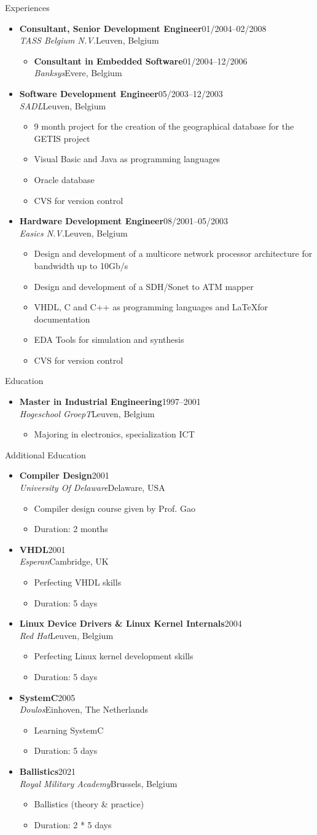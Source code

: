 \documentclass[12pt,oneside]{article}
\newenvironment{ressection}[1]{
	\vspace{5pt}
	{\selectfont\Large#1}
	\begin{itemize}
	\vspace{5pt}
}{
	\end{itemize}
}
\newcommand{\ressubitem}[1]{
	\vspace{-4pt}
	\item \begin{flushleft} #1 \end{flushleft}
}
\newcommand{\resbigitem}[4]{
	\vspace{-5pt}
	\item
	\textbf{#1}\hfill#4 \\
	\textit{#2}\hfill#3
}
\newenvironment{ressubsec}[4]{
	\resbigitem{#1}{#2}{#3}{#4}
	\vspace{-2pt}
	\begin{itemize}
}{
	\end{itemize}
}
\newenvironment{ressubsubsec}[4]{
	\vspace{5pt}
	\resbigitem{#1}{#2}{#3}{#4}
	\begin{itemize}
}{
	\end{itemize}
}
\begin{document}
\begin{ressection}{Experiences}
\begin{ressubsec}{Consultant, Senior Development Engineer}{TASS Belgium N.V.}{Leuven, Belgium}{01/2004--02/2008}
\begin{ressubsubsec}{Consultant in Embedded Software}{Banksys}{Evere, Belgium}{01/2004--12/2006}
		\end{ressubsubsec}
	\end{ressubsec}
	\begin{ressubsec}{Software Development Engineer}{SADL}{Leuven, Belgium}{05/2003--12/2003}
		\ressubitem{9 month project for the creation of the geographical database for the GETIS project}
		\ressubitem{Visual Basic and Java as programming languages}
		\ressubitem{Oracle database}
		\ressubitem{CVS for version control}
	\end{ressubsec}
	\begin{ressubsec}{Hardware Development Engineer}{Easics N.V.}{Leuven, Belgium}{08/2001--05/2003}
		\ressubitem{Design and development of a multicore network processor architecture for bandwidth up to 10Gb/s}
		\ressubitem{Design and development of a SDH/Sonet to ATM mapper}
		\ressubitem{VHDL, C and C++ as programming languages and \LaTeX for documentation}
		\ressubitem{EDA Tools for simulation and synthesis}
		\ressubitem{CVS for version control}
	\end{ressubsec}
\end{ressection}

\begin{ressection}{Education}
	\begin{ressubsec}{Master in Industrial Engineering}{Hogeschool GroepT}{Leuven, Belgium}{1997--2001}
		\ressubitem{Majoring in electronics, specialization ICT}
	\end{ressubsec}
\end{ressection}

\begin{ressection}{Additional Education}
	\begin{ressubsec}{Compiler Design}{University Of Delaware}{Delaware, USA}{2001}
		\ressubitem{Compiler design course given by Prof. Gao}
		\ressubitem{Duration: 2 months}
	\end{ressubsec}
	\begin{ressubsec}{VHDL}{Esperan}{Cambridge, UK}{2001}
		\ressubitem{Perfecting VHDL skills}
		\ressubitem{Duration: 5 days}
	\end{ressubsec}
	\begin{ressubsec}{Linux Device Drivers \& Linux Kernel Internals}{Red Hat}{Leuven, Belgium}{2004}
		\ressubitem{Perfecting Linux kernel development skills}
		\ressubitem{Duration: 5 days}
	\end{ressubsec}
	\begin{ressubsec}{SystemC}{Doulos}{Einhoven, The Netherlands}{2005}
		\ressubitem{Learning SystemC}
		\ressubitem{Duration: 5 days}
	\end{ressubsec}
    \begin{ressubsec}{Ballistics}{Royal Military Academy}{Brussels, Belgium}{2021}
        \ressubitem{Ballistics (theory \& practice)}
        \ressubitem{Duration: 2 * 5 days}
   \end{ressubsec}
\end{ressection}
\end{document}

